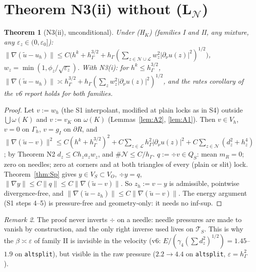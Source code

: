 \documentclass[11pt]{article}
\newtheorem{theorem}{Theorem}
\theoremstyle{remark}
\newtheorem{remark}[theorem]{Remark}
\newcommand{\hG}{h_\Gamma}
\newcommand{\VO}{V_O}
\newcommand{\dn}{\partial_\nu}
\newcommand{\norm}[1]{\|#1\|}
\newcommand{\Nset}{\mathcal N}
\newcommand{\Lk}{\mathcal L}
\begin{document}
\section{Theorem N3(ii) without (L$_\Nset$)}\label{sec:N3}
\begin{theorem}[N3(ii), unconditional]\label{thm:N3u}
Under (H$_K$) (families I and II, any mixture, any $\varepsilon_z\in(0,\varepsilon_0]$):
$\norm{\nabla(\tilde u-u_h)}\le C\big(h^k+\hG^{3/2}+\hG(\sum_{z\in\Nset\cup\Lk}w_z^2|\dn u(z)|^2)^{1/2}\big)$, $w_z=\min(1,\phi_z/\sqrt{\varepsilon_z})$.
With N3(i): for $h^k\le\hG^{3/2}$, $\norm{\nabla(\tilde u-u_h)}\asymp\hG^{3/2}+\hG(\sum_zw_z^2|\dn u(z)|^2)^{1/2}$, and the rates corollary of the v6 report
holds for both families.
\end{theorem}
\begin{proof}
Let $v:=w_h$ (the S1 interpolant, modified at plain locks as in S4) outside $\bigcup\omega(K)$ and $v:=v_K$ on $\omega(K)$ (Lemmas~\ref{lem:A2}, \ref{lem:A1}). Then
$v\in V_h$, $v=0$ on $\Gamma_h$, $v=g_I$ on $\partial R$, and
$\norm{\nabla(\tilde u-v)}^2\le C(h^k+\hG^{3/2})^2+C\sum_{z\in\Lk}\hG^2|\dn u(z)|^2+C\sum_{z\in\Nset}(d_z^2+h_z^4)$; by Theorem N2 $d_z\le Ch_za_zw_z$, and $\#\Nset\le C/\hG$.
$q:=\div v\in Q_S$: mean $m_R=0$; zero on needles; zero at corners and at both triangles of every (plain or slit) lock. Theorem~\ref{thm:Sp} gives
$y\in V_S\subset\VO$, $\div y=q$, $\norm{\nabla y}\le C\norm q\le C\norm{\nabla(\tilde u-v)}$. So $z_h:=v-y$ is admissible, pointwise divergence-free, and
$\norm{\nabla(\tilde u-z_h)}\le C\norm{\nabla(\tilde u-v)}$. The energy argument (S1 steps 4--5) is pressure-free and geometry-only: it needs no inf-sup.
\end{proof}
\begin{remark}
The proof never inverts $\div$ on a needle: needle pressures are made to vanish by construction, and the only right inverse used lives on
$\mathcal T_S$. This is why the $\beta\asymp\varepsilon$ of family II is invisible in the velocity (v6: $E/(\gamma_4(\sum d_z^2)^{1/2})=1.45$--$1.9$ on
\texttt{altsplit}), but visible in the raw pressure ($2.2\to4.4$ on \texttt{altsplit}, $\varepsilon=\hG^2$).
\end{remark}
\end{document}
